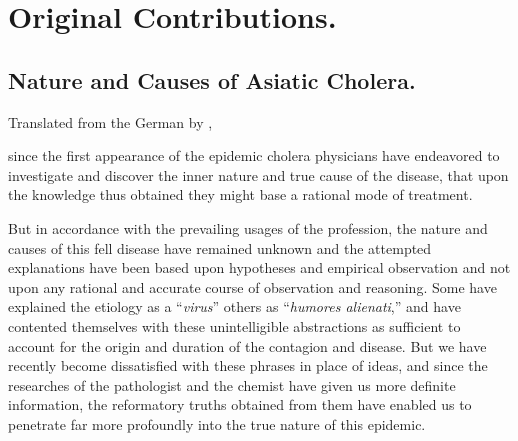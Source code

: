 
\chapter*{Original Contributions.}

\section*{Nature and Causes of Asiatic Cholera.}


\footnotesize
\begin{center}Translated from the German by , \md\end{center}
\normalsize

 since the first appearance of the epidemic cholera physicians
have endeavored to investigate and discover the inner nature and true
cause of the disease, that upon the knowledge thus obtained they might
base a rational mode of treatment.

But in accordance with the prevailing usages of the profession, the
nature and causes of this fell disease have remained unknown and the
attempted explanations have been based upon hypotheses and empirical
observation and not upon any rational and accurate course of
observation and reasoning. Some have explained the etiology as
a ``\textit{virus}'' others as ``\textit{humores alienati},'' and have contented themselves
with these unintelligible abstractions as sufficient to account for
the origin and duration of the contagion and disease. But we have
recently become dissatisfied with these phrases in place of ideas, and
since the researches of the pathologist and the chemist have given us
more definite information, the reformatory truths obtained from them
have enabled us to penetrate far more profoundly into the true nature
of this epidemic.
\endinput